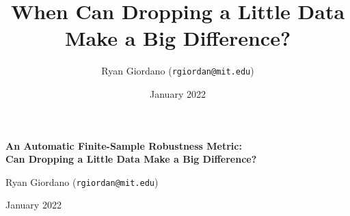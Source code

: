 \documentclass[10pt]{beamer}
\title{When Can Dropping a Little Data Make a Big Difference?}
\author{Ryan Giordano (\texttt{rgiordan@mit.edu})}
\date{January 2022}
\begin{document}

\begin{frame}

\begin{center}
\large
\textbf{
An Automatic Finite-Sample Robustness Metric:
\\Can Dropping a Little Data Make a Big Difference?}
\end{center}

\hrulefill

Ryan Giordano (\texttt{rgiordan@mit.edu})\footnotemark[1]

January 2022


\end{frame}


















%
%
\end{document}

